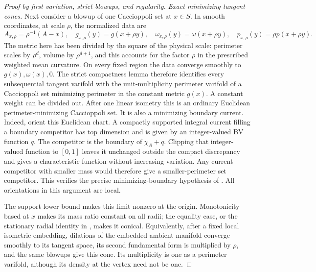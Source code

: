\begin{proof}[Proof by first variation, strict blowups, and regularity]
\emph{Exact minimizing tangent cones.}
Next consider a blowup of one Caccioppoli set at $x\in S$.  In smooth coordinates,
at scale $\rho$, the normalized data are
\[
 A_{x,\rho}=\rho^{-1}(A-x),\quad
 g_{x,\rho}(y)=g(x+\rho y),\quad
 \omega_{x,\rho}(y)=\omega(x+\rho y),\quad
 p_{x,\rho}(y)=\rho p(x+\rho y).
\]
The metric here has been divided by the square of the physical scale:
perimeter scales by $\rho^d$, volume by $\rho^{d+1}$, and this accounts
for the factor $\rho$ in the prescribed weighted mean curvature.  On every fixed region the data
converge smoothly to $g(x),\omega(x),0$.  The strict compactness lemma
therefore identifies every subsequential tangent varifold with the
unit-multiplicity perimeter varifold of a Caccioppoli set minimizing perimeter
in the constant metric $g(x)$.  A constant weight can be divided out.
After one linear isometry this is an ordinary Euclidean
perimeter-minimizing Caccioppoli set.  It is also a minimizing boundary current.
Indeed, orient this Euclidean chart.  A compactly supported integral
current filling a boundary competitor has top dimension and is given
by an integer-valued BV function $q$.  The competitor is the boundary
of $\chi_A+q$.  Clipping that integer-valued function to $[0,1]$ leaves
it unchanged outside the compact discrepancy and gives a characteristic
function without increasing variation.  Any current competitor with
smaller mass would therefore give a smaller-perimeter set competitor.
This verifies the precise minimizing-boundary hypothesis of
\citet[Chapter~7, Theorem~5.8]{simonGMT}.  All orientations in this
argument are local.

The support lower bound makes this limit nonzero at the origin.
Monotonicity based at $x$ makes its mass ratio constant on all radii;
the equality case, or the stationary radial identity in
\citet[Chapter~4, Equation~(3.6)]{simonGMT}, makes it conical.
Equivalently, after a fixed local isometric embedding, dilations of
the embedded ambient manifold converge smoothly to its tangent
space, its second fundamental form is multiplied by $\rho$, and
the same blowups give this cone.  Its multiplicity is one as a
perimeter varifold, although its density at the vertex need not
be one.


\end{proof}

